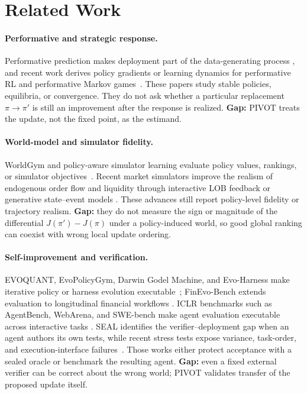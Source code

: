 \documentclass{article} %
\begin{document}
\section{Related Work}
\paragraph{Performative and strategic response.}
Performative prediction makes deployment part of the data-generating process
\cite{perdomo2020performative,mandal2022performative}, and recent work derives
policy gradients or learning dynamics for performative RL and performative
Markov games~\cite{performativepg2025,performativempg2025,map2025,multiagentperformative2022}.
These papers study stable policies, equilibria, or convergence. They do not
ask whether a particular replacement $\pi\!\to\!\pi'$ is still an improvement
after the response is realized. \textbf{Gap:} PIVOT treats the update, not
the fixed point, as the estimand.

\paragraph{World-model and simulator fidelity.}
WorldGym and policy-aware simulator learning evaluate policy values, rankings,
or simulator objectives~\cite{worldgym2025,policyaware2026,tdmpc22024}. Recent market
simulators improve the realism of endogenous order flow and liquidity through
interactive LOB feedback or generative state--event models
\cite{lobreality2026,m3market2026,tradefm2026}. These advances still report
policy-level fidelity or trajectory realism. \textbf{Gap:} they do not measure
the sign or magnitude of the differential
$J(\pi')-J(\pi)$ under a policy-induced world, so good global ranking can
coexist with wrong local update ordering.

\paragraph{Self-improvement and verification.}
EVOQUANT, EvoPolicyGym, Darwin Godel Machine, and Evo-Harness make iterative
policy or harness evolution executable~\cite{evoquant2026,evopolicygym2026,dgm2025,evoharness2026};
FinEvo-Bench extends evaluation to longitudinal financial workflows
\cite{finevobench2026}. ICLR benchmarks such as AgentBench, WebArena, and
SWE-bench make agent evaluation executable across interactive tasks
\cite{agentbench2024,webarena2024,swebench2024}. SEAL identifies the
verifier--deployment gap when an agent authors its own tests, while recent stress tests expose variance,
task-order, and execution-interface failures~\cite{selfauthored2026,fragility2026,auditingfinagents2026,sbco2026}.
Those works either protect acceptance with a sealed oracle or benchmark the
resulting agent. \textbf{Gap:} even a fixed external verifier can be correct
about the wrong world; PIVOT validates transfer of the proposed update itself.
\end{document}
